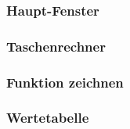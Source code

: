 \documentclass[12pt,a4paper]{article}
\newcommand{\project}{/home/jonas/Dokumente/Java-Projekte/GraphingCalculator/src/main/java/de/jonas/graphingcalculator}
\begin{document}
    \subsubsection{Haupt-Fenster}
    

    \newpage

    \subsubsection{Taschenrechner}
    

    \newpage

    \subsubsection{Funktion zeichnen}
    

    \newpage

    \subsubsection{Wertetabelle}
    
\end{document}
